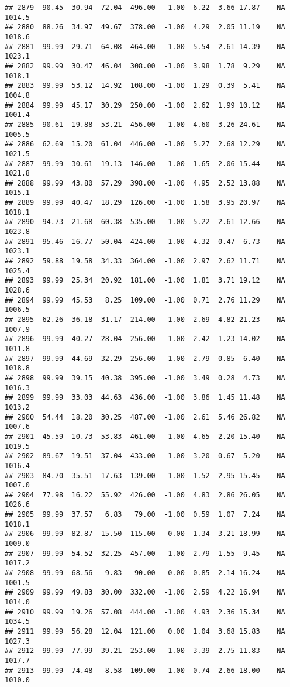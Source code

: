 \documentclass{article}\usepackage{graphicx, color}
\makeatletter
\newenvironment{kframe}{%
 \def\at@end@of@kframe{}%
 \ifinner\ifhmode%
  \def\at@end@of@kframe{\end{minipage}}%
  \begin{minipage}{\columnwidth}%
 \fi\fi%
 \def\FrameCommand##1{\hskip\@totalleftmargin \hskip-\fboxsep
 \colorbox{shadecolor}{##1}\hskip-\fboxsep
     \hskip-\linewidth \hskip-\@totalleftmargin \hskip\columnwidth}%
 \MakeFramed {\advance\hsize-\width
   \@totalleftmargin\z@ \linewidth\hsize
   \@setminipage}}%
 {\par\unskip\endMakeFramed%
 \at@end@of@kframe}
\newenvironment{knitrout}{}{} %
\makeatother
\begin{document}
\begin{knitrout}
\begin{kframe}
\begin{verbatim}
## 2879  90.45  30.94  72.04  496.00  -1.00  6.22  3.66 17.87    NA 1014.5
## 2880  88.26  34.97  49.67  378.00  -1.00  4.29  2.05 11.19    NA 1018.6
## 2881  99.99  29.71  64.08  464.00  -1.00  5.54  2.61 14.39    NA 1023.1
## 2882  99.99  30.47  46.04  308.00  -1.00  3.98  1.78  9.29    NA 1018.1
## 2883  99.99  53.12  14.92  108.00  -1.00  1.29  0.39  5.41    NA 1004.8
## 2884  99.99  45.17  30.29  250.00  -1.00  2.62  1.99 10.12    NA 1001.4
## 2885  90.61  19.88  53.21  456.00  -1.00  4.60  3.26 24.61    NA 1005.5
## 2886  62.69  15.20  61.04  446.00  -1.00  5.27  2.68 12.29    NA 1021.5
## 2887  99.99  30.61  19.13  146.00  -1.00  1.65  2.06 15.44    NA 1021.8
## 2888  99.99  43.80  57.29  398.00  -1.00  4.95  2.52 13.88    NA 1015.1
## 2889  99.99  40.47  18.29  126.00  -1.00  1.58  3.95 20.97    NA 1018.1
## 2890  94.73  21.68  60.38  535.00  -1.00  5.22  2.61 12.66    NA 1023.8
## 2891  95.46  16.77  50.04  424.00  -1.00  4.32  0.47  6.73    NA 1023.1
## 2892  59.88  19.58  34.33  364.00  -1.00  2.97  2.62 11.71    NA 1025.4
## 2893  99.99  25.34  20.92  181.00  -1.00  1.81  3.71 19.12    NA 1028.6
## 2894  99.99  45.53   8.25  109.00  -1.00  0.71  2.76 11.29    NA 1006.5
## 2895  62.26  36.18  31.17  214.00  -1.00  2.69  4.82 21.23    NA 1007.9
## 2896  99.99  40.27  28.04  256.00  -1.00  2.42  1.23 14.02    NA 1011.8
## 2897  99.99  44.69  32.29  256.00  -1.00  2.79  0.85  6.40    NA 1018.8
## 2898  99.99  39.15  40.38  395.00  -1.00  3.49  0.28  4.73    NA 1016.3
## 2899  99.99  33.03  44.63  436.00  -1.00  3.86  1.45 11.48    NA 1013.2
## 2900  54.44  18.20  30.25  487.00  -1.00  2.61  5.46 26.82    NA 1007.6
## 2901  45.59  10.73  53.83  461.00  -1.00  4.65  2.20 15.40    NA 1019.5
## 2902  89.67  19.51  37.04  433.00  -1.00  3.20  0.67  5.20    NA 1016.4
## 2903  84.70  35.51  17.63  139.00  -1.00  1.52  2.95 15.45    NA 1007.0
## 2904  77.98  16.22  55.92  426.00  -1.00  4.83  2.86 26.05    NA 1026.6
## 2905  99.99  37.57   6.83   79.00  -1.00  0.59  1.07  7.24    NA 1018.1
## 2906  99.99  82.87  15.50  115.00   0.00  1.34  3.21 18.99    NA 1009.0
## 2907  99.99  54.52  32.25  457.00  -1.00  2.79  1.55  9.45    NA 1017.2
## 2908  99.99  68.56   9.83   90.00   0.00  0.85  2.14 16.24    NA 1001.5
## 2909  99.99  49.83  30.00  332.00  -1.00  2.59  4.22 16.94    NA 1014.0
## 2910  99.99  19.26  57.08  444.00  -1.00  4.93  2.36 15.34    NA 1034.5
## 2911  99.99  56.28  12.04  121.00   0.00  1.04  3.68 15.83    NA 1027.3
## 2912  99.99  77.99  39.21  253.00  -1.00  3.39  2.75 11.83    NA 1017.7
## 2913  99.99  74.48   8.58  109.00  -1.00  0.74  2.66 18.00    NA 1010.0

\end{verbatim}
\end{kframe}
\end{knitrout}
\end{document}

